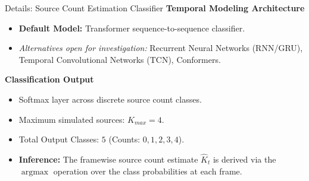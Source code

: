 \documentclass[8pt,hyperref={pdfpagelabels=true},xcolor=table,aspectratio=169]{beamer}
\DeclareMathOperator*{\argmax}{argmax}
\begin{document}
\begin{frame}{Details: Source Count Estimation Classifier}
    \textbf{Temporal Modeling Architecture}
    \begin{itemize}
        \item \textbf{Default Model:} Transformer sequence-to-sequence classifier.
        \item \textit{Alternatives open for investigation:} Recurrent Neural Networks (RNN/GRU), Temporal Convolutional Networks (TCN), Conformers.
    \end{itemize}
    \vspace{1em}
    \textbf{Classification Output}
    \begin{itemize}
        \item Softmax layer across discrete source count classes.
        \item Maximum simulated sources: $K_{max} = 4$.
        \item Total Output Classes: $5$ (Counts: $0, 1, 2, 3, 4$).
        \item \textbf{Inference:} The framewise source count estimate $\widehat{K}_t$ is derived via the $\argmax$ operation over the class probabilities at each frame.
    \end{itemize}
\end{frame}
\end{document}
